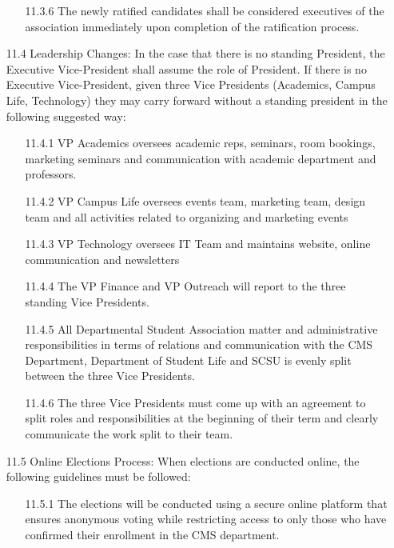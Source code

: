 \documentclass[12pt,a4paper]{article}
\begin{document}
\begin{enumerate}
\begin{enumerate}
\item[11.3.6] The newly ratified candidates shall be considered executives of the association immediately upon completion of the ratification process.
\end{enumerate}

\item[11.4] Leadership Changes: In the case that there is no standing President, the Executive Vice-President shall assume the role of President. If there is no Executive Vice-President, given three Vice Presidents (Academics, Campus Life, Technology) they may carry forward without a standing president in the following suggested way:

\begin{enumerate}
\item[11.4.1] VP Academics oversees academic reps, seminars, room bookings, marketing seminars and communication with academic department and professors.

\item[11.4.2] VP Campus Life oversees events team, marketing team, design team and all activities related to organizing and marketing events

\item[11.4.3] VP Technology oversees IT Team and maintains website, online communication and newsletters

\item[11.4.4] The VP Finance and VP Outreach will report to the three standing Vice Presidents.

\item[11.4.5] All Departmental Student Association matter and administrative responsibilities in terms of relations and communication with the CMS Department, Department of Student Life and SCSU is evenly split between the three Vice Presidents.

\item[11.4.6] The three Vice Presidents must come up with an agreement to split roles and responsibilities at the beginning of their term and clearly communicate the work split to their team.
\end{enumerate}

\item[11.5] Online Elections Process: When elections are conducted online, the following guidelines must be followed:

\begin{enumerate}
\item[11.5.1] The elections will be conducted using a secure online platform that ensures anonymous voting while restricting access to only those who have confirmed their enrollment in the CMS department.


\end{enumerate}
\end{enumerate}
\end{document}
